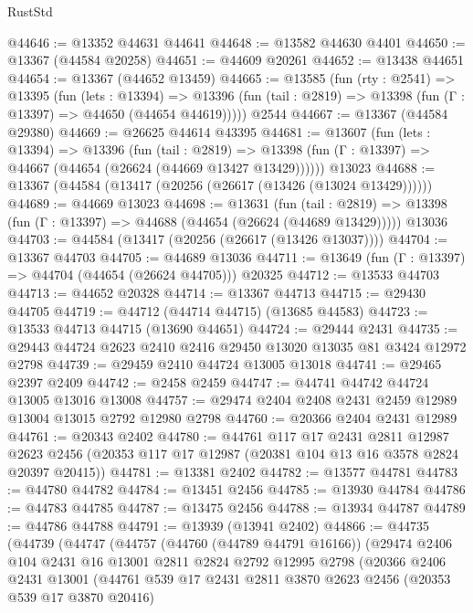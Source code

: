 \begin{lexlean}{RustStd}
\begin{coremodule}
@44646 := @13352 @44631 @44641
@44648 := @13582 @44630 @4401
@44650 := @13367 (@44584 @20258)
@44651 := @44609 @20261
@44652 := @13438 @44651
@44654 := @13367 (@44652 @13459)
@44665 := @13585
    (fun (rty : @2541) =>
    @13395
      (fun (lets : @13394) =>
      @13396 (fun (tail : @2819) => @13398 (fun (Γ : @13397) => @44650 (@44654 @44619)))))
    @2544
@44667 := @13367 (@44584 @29380)
@44669 := @26625 @44614 @43395
@44681 := @13607
    (fun (lets : @13394) =>
    @13396
      (fun (tail : @2819) =>
      @13398 (fun (Γ : @13397) => @44667 (@44654 (@26624 (@44669 @13427 @13429))))))
    @13023
@44688 := @13367 (@44584 (@13417 (@20256 (@26617 (@13426 (@13024 @13429))))))
@44689 := @44669 @13023
@44698 := @13631
    (fun (tail : @2819) => @13398 (fun (Γ : @13397) => @44688 (@44654 (@26624 (@44689 @13429)))))
    @13036
@44703 := @44584 (@13417 (@20256 (@26617 (@13426 @13037))))
@44704 := @13367 @44703
@44705 := @44689 @13036
@44711 := @13649 (fun (Γ : @13397) => @44704 (@44654 (@26624 @44705))) @20325
@44712 := @13533 @44703
@44713 := @44652 @20328
@44714 := @13367 @44713
@44715 := @29430 @44705
@44719 := @44712 (@44714 @44715) (@13685 @44583)
@44723 := @13533 @44713 @44715 (@13690 @44651)
@44724 := @29444 @2431
@44735 := @29443 @44724 @2623 @2410 @2416 @29450 @13020 @13035 @81 @3424 @12972 @2798
@44739 := @29459 @2410 @44724 @13005 @13018
@44741 := @29465 @2397 @2409
@44742 := @2458 @2459
@44747 := @44741 @44742 @44724 @13005 @13016 @13008
@44757 := @29474 @2404 @2408 @2431 @2459 @12989 @13004 @13015 @2792 @12980 @2798
@44760 := @20366 @2404 @2431 @12989
@44761 := @20343 @2402
@44780 := @44761
    @117
    @17
    @2431
    @2811
    @12987
    @2623
    @2456
    (@20353 @117 @17 @12987 (@20381 @104 @13 @16 @3578 @2824 @20397 @20415))
@44781 := @13381 @2402
@44782 := @13577 @44781
@44783 := @44780 @44782
@44784 := @13451 @2456
@44785 := @13930 @44784
@44786 := @44783 @44785
@44787 := @13475 @2456
@44788 := @13934 @44787
@44789 := @44786 @44788
@44791 := @13939 (@13941 @2402)
@44866 := @44735
    (@44739
      (@44747
        (@44757
          (@44760 (@44789 @44791 @16166))
          (@29474
            @2406
            @104
            @2431
            @16
            @13001
            @2811
            @2824
            @2792
            @12995
            @2798
            (@20366
              @2406
              @2431
              @13001
              (@44761
                @539
                @17
                @2431
                @2811
                @3870
                @2623
                @2456
                (@20353 @539 @17 @3870 @20416)

\end{coremodule}
\end{lexlean}
